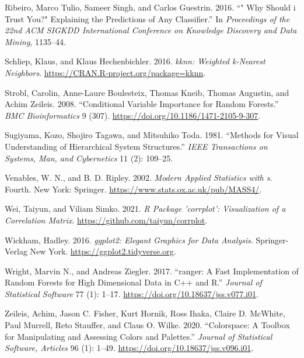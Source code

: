 \begin{CSLReferences}{1}{0}
\leavevmode{}%
Ribeiro, Marco Tulio, Sameer Singh, and Carlos Guestrin. 2016. {``" Why Should i Trust You?" Explaining the Predictions of Any Classifier.''} In \emph{Proceedings of the 22nd ACM SIGKDD International Conference on Knowledge Discovery and Data Mining}, 1135--44.

\leavevmode{}%
Schliep, Klaus, and Klaus Hechenbichler. 2016. \emph{{kknn}: Weighted k-Nearest Neighbors}. \url{https://CRAN.R-project.org/package=kknn}.

\leavevmode{}%
Strobl, Carolin, Anne-Laure Boulesteix, Thomas Kneib, Thomas Augustin, and Achim Zeileis. 2008. {``Conditional Variable Importance for Random Forests.''} \emph{BMC Bioinformatics} 9 (307). \url{https://doi.org/10.1186/1471-2105-9-307}.

\leavevmode{}%
Sugiyama, Kozo, Shojiro Tagawa, and Mitsuhiko Toda. 1981. {``Methods for Visual Understanding of Hierarchical System Structures.''} \emph{IEEE Transactions on Systems, Man, and Cybernetics} 11 (2): 109--25.

\leavevmode{}%
Venables, W. N., and B. D. Ripley. 2002. \emph{Modern Applied Statistics with s}. Fourth. New York: Springer. \url{https://www.stats.ox.ac.uk/pub/MASS4/}.

\leavevmode{}%
Wei, Taiyun, and Viliam Simko. 2021. \emph{R Package '{corrplot}': Visualization of a Correlation Matrix}. \url{https://github.com/taiyun/corrplot}.

\leavevmode{}%
Wickham, Hadley. 2016. \emph{{ggplot2}: Elegant Graphics for Data Analysis}. Springer-Verlag New York. \url{https://ggplot2.tidyverse.org}.

\leavevmode{}%
Wright, Marvin N., and Andreas Ziegler. 2017. {``{ranger}: A Fast Implementation of Random Forests for High Dimensional Data in {C++} and {R}.''} \emph{Journal of Statistical Software} 77 (1): 1--17. \url{https://doi.org/10.18637/jss.v077.i01}.

\leavevmode{}%
Zeileis, Achim, Jason C. Fisher, Kurt Hornik, Ross Ihaka, Claire D. McWhite, Paul Murrell, Reto Stauffer, and Claus O. Wilke. 2020. {``Colorspace: A Toolbox for Manipulating and Assessing Colors and Palettes.''} \emph{Journal of Statistical Software, Articles} 96 (1): 1--49. \url{https://doi.org/10.18637/jss.v096.i01}.

\end{CSLReferences}

